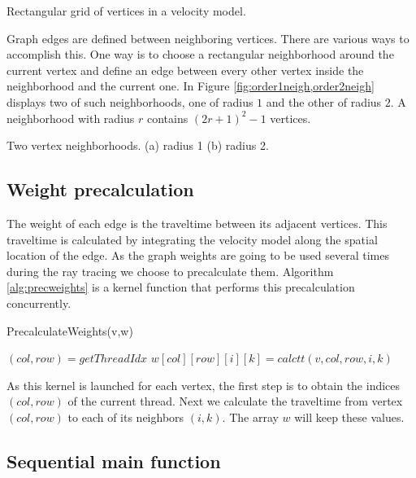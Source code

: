 {Rectangular grid of vertices in a velocity model.}

Graph edges are defined between neighboring vertices. There are 
various ways to accomplish this. One way is to choose a rectangular 
neighborhood around the current vertex and define an edge 
between every other vertex inside the neighborhood and the 
current one. In Figure \ref{fig:order1neigh,order2neigh}
displays two of such neighborhoods, one of radius $1$ and
the other of radius $2$. A neighborhood with radius $r$ 
contains $(2r+1)^2-1$ vertices.

{Two vertex neighborhoods. (a) radius 1 (b) radius 2.}

\subsection*{Weight precalculation}

The weight of each edge is the traveltime between its adjacent
vertices. This traveltime is calculated by integrating the velocity
model along the spatial location of the edge. As the graph weights
are going to be used several times during the ray tracing we
choose to precalculate them. Algorithm \ref{alg:precweights} is a kernel 
function that performs this precalculation concurrently.

\begin{algorithm}
 \caption{PrecalculateWeights(v,w)}
 \label{alg:precweights}
 \begin{algorithmic}[1]
  \STATE $(col,row) = getThreadIdx$    
    \STATE $w[col][row][i][k] = calctt(v,col,row,i,k)$
  \ENDFOR
 \end{algorithmic}
\end{algorithm}

As this kernel is launched  for each vertex, the first 
step is to obtain the indices $(col,row)$ of the current thread.
Next we calculate the traveltime from vertex $(col,row)$
to each of its neighbors $(i,k)$. The array $w$ will keep 
these values. 

\subsection*{Sequential main function}

